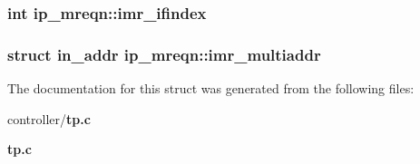 \subsubsection[{imr\_\-ifindex}]{\setlength{\rightskip}{0pt plus 5cm}int {\bf ip\_\-mreqn::imr\_\-ifindex}}\label{structip__mreqn_a57e6e1acbf98da91859c8c95e555f5a7}
\subsubsection[{imr\_\-multiaddr}]{\setlength{\rightskip}{0pt plus 5cm}struct {\bf in\_\-addr} {\bf ip\_\-mreqn::imr\_\-multiaddr}}\label{structip__mreqn_ad359b69f0d0e147fe1fb82045ba6cb8e}


The documentation for this struct was generated from the following files:\begin{DoxyCompactItemize}
\item 
controller/{\bf tp.c}\item 
{\bf tp.c}\end{DoxyCompactItemize}

